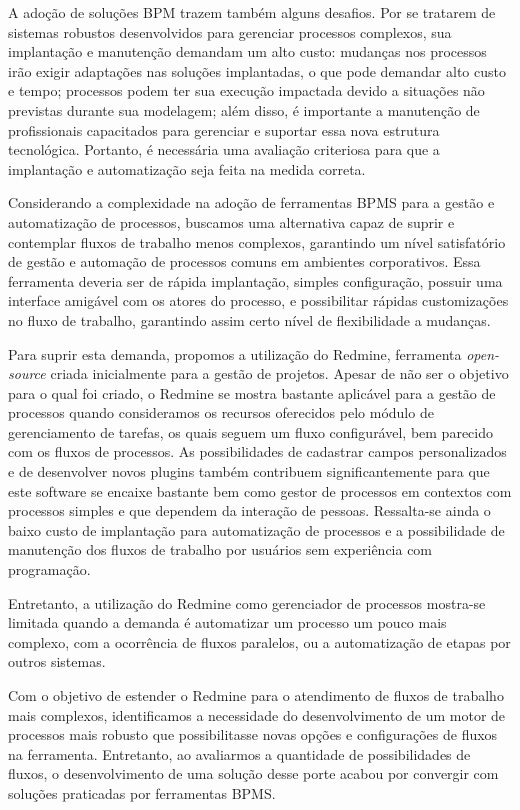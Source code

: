 A adoção de soluções BPM trazem também alguns desafios. Por se tratarem de sistemas robustos desenvolvidos para gerenciar processos complexos, sua implantação e manutenção demandam um alto custo: mudanças nos processos irão exigir adaptações nas soluções implantadas, o que pode demandar alto custo e tempo; processos podem ter sua execução impactada devido a situações não previstas durante sua modelagem; além disso, é importante a manutenção de profissionais capacitados para gerenciar e suportar essa nova estrutura tecnológica. Portanto, é necessária uma avaliação criteriosa para que a implantação e automatização seja feita na medida correta.

Considerando a complexidade na adoção de ferramentas BPMS para a gestão e automatização de processos, buscamos uma alternativa capaz de suprir e contemplar fluxos de trabalho menos complexos, garantindo um nível satisfatório de gestão e automação de processos comuns em ambientes corporativos. Essa ferramenta deveria ser de rápida implantação, simples configuração, possuir uma interface amigável com os atores do processo, e possibilitar rápidas customizações no fluxo de trabalho, garantindo assim certo nível de flexibilidade a mudanças.

Para suprir esta demanda, propomos a utilização do Redmine, ferramenta \textit{open-source} criada inicialmente para a gestão de projetos. Apesar de não ser o objetivo para o qual foi criado, o Redmine se mostra bastante aplicável para a gestão de processos quando consideramos os recursos oferecidos pelo módulo de gerenciamento de tarefas, os quais seguem um fluxo configurável, bem parecido com os fluxos de processos. As possibilidades de cadastrar campos personalizados e de desenvolver novos plugins também contribuem significantemente para que este software se encaixe bastante bem como gestor de processos em contextos com processos simples e que dependem da interação de pessoas. Ressalta-se ainda o baixo custo de implantação para automatização de processos e a possibilidade de manutenção dos fluxos de trabalho por usuários sem experiência com programação.

Entretanto, a utilização do Redmine como gerenciador de processos mostra-se limitada quando a demanda é automatizar um processo um pouco mais complexo, com a ocorrência de fluxos paralelos, ou a automatização de etapas por outros sistemas.

Com o objetivo de estender o Redmine para o atendimento de fluxos de trabalho mais complexos, identificamos a necessidade do desenvolvimento de um motor de processos mais robusto que possibilitasse novas opções e configurações de fluxos na ferramenta. Entretanto, ao avaliarmos a quantidade de possibilidades de fluxos, o desenvolvimento de uma solução desse porte acabou por convergir com soluções praticadas por ferramentas BPMS. 

